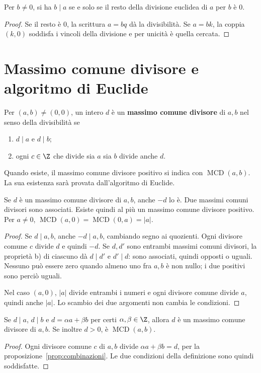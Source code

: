 \begin{corollario}
Per $b\ne0$, si ha $b\mid a$ se e solo se il resto della divisione euclidea di $a$ per $b$ è $0$.
\end{corollario}
\begin{proof}
Se il resto è $0$, la scrittura $a=bq$ dà la divisibilità. Se $a=bk$, la coppia $(k,0)$ soddisfa i vincoli della divisione e per unicità è quella cercata.
\end{proof}

\section{Massimo comune divisore e algoritmo di Euclide}
\begin{definizione}
Per $(a,b)\ne(0,0)$, un intero $d$ è un \textbf{massimo comune divisore} di $a,b$ nel senso della divisibilità se
\begin{enumerate}[label=\alph*)]
  \item $d\mid a$ e $d\mid b$;
  \item ogni $c\in\Z$ che divide sia $a$ sia $b$ divide anche $d$.
\end{enumerate}
Quando esiste, il massimo comune divisore positivo si indica con $\operatorname{MCD}(a,b)$. La sua esistenza sarà provata dall'algoritmo di Euclide.
\end{definizione}

\begin{proposizione}
Se $d$ è un massimo comune divisore di $a,b$, anche $-d$ lo è. Due massimi comuni divisori sono associati. Esiste quindi al più un massimo comune divisore positivo. Per $a\ne0$, $\operatorname{MCD}(a,0)=\operatorname{MCD}(0,a)=|a|$.
\end{proposizione}
\begin{proof}
Se $d\mid a,b$, anche $-d\mid a,b$, cambiando segno ai quozienti. Ogni divisore comune $c$ divide $d$ e quindi $-d$. Se $d,d'$ sono entrambi massimi comuni divisori, la proprietà b) di ciascuno dà $d\mid d'$ e $d'\mid d$: sono associati, quindi opposti o uguali. Nessuno può essere zero quando almeno uno fra $a,b$ è non nullo; i due positivi sono perciò uguali.

Nel caso $(a,0)$, $|a|$ divide entrambi i numeri e ogni divisore comune divide $a$, quindi anche $|a|$. Lo scambio dei due argomenti non cambia le condizioni.
\end{proof}

\begin{proposizione}\label{prop:criterio-mcd}
Se $d\mid a$, $d\mid b$ e $d=\alpha a+\beta b$ per certi $\alpha,\beta\in\Z$, allora $d$ è un massimo comune divisore di $a,b$. Se inoltre $d>0$, è $\operatorname{MCD}(a,b)$.
\end{proposizione}
\begin{proof}
Ogni divisore comune $c$ di $a,b$ divide $\alpha a+\beta b=d$, per la proposizione~\ref{prop:combinazioni}. Le due condizioni della definizione sono quindi soddisfatte.
\end{proof}

